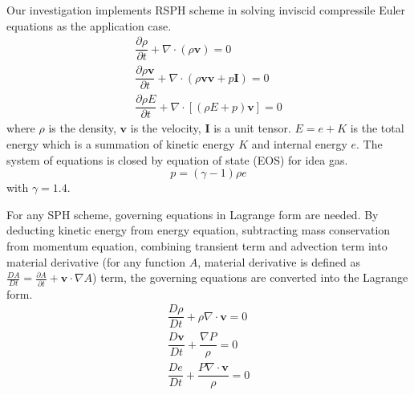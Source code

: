 Our investigation implements RSPH scheme in solving inviscid compressile Euler equations as the application case.  
\begin{align}
\dfrac{\partial \rho}{\partial t} + \nabla \cdot \left(\rho \textbf{v} \right) = 0 \label{eq:gov-cs-rho} \\
\dfrac{\partial \rho \textbf{v}}{\partial t} + \nabla \cdot \left(\rho \textbf{v} \textbf{v} + p\textbf{I}\right) = 0 \label{eq:gov-cs-v} \\
\dfrac{\partial \rho E}{\partial t} + \nabla \cdot \left[\left(\rho E + p \right)\textbf{v}\right] = 0 \label{eq:gov-cs-e}
\end{align}
where $\rho$ is the density, $\textbf{v}$ is the velocity, $\textbf{I}$ is a unit tensor.
$E = e + K $ is the total energy which is a summation of kinetic energy $K$ and internal energy $e$.
The system of equations is closed by equation of state (EOS) for idea gas.
\begin{equation}
p = \left(\gamma - 1\right)\rho e \label{eq:EOS}
\end{equation}
with $\gamma=1.4$.

For any SPH scheme, governing equations in Lagrange form are needed. By deducting kinetic energy from energy equation, subtracting mass conservation from momentum equation, combining transient term and advection term into material derivative (for any function $A$, material derivative is defined as $\frac{D A}{Dt} = \frac{\partial A}{\partial t} + \textbf{v} \cdot \nabla A$) term, the governing equations are converted into the Lagrange form. 
\begin{align}
\dfrac{D \rho}{D t} + \rho \nabla \cdot \textbf{v} = 0 \label{eq:gov-nc-rho}\\
\dfrac{D \textbf{v}}{D t} + \dfrac{\nabla P}{\rho} =0 \label{eq:gov-nc-v}\\
\dfrac{D e}{D t} + \dfrac{P \nabla \cdot \textbf{v}}{\rho} = 0 \label{eq:gov-nc-e}
\end{align}

